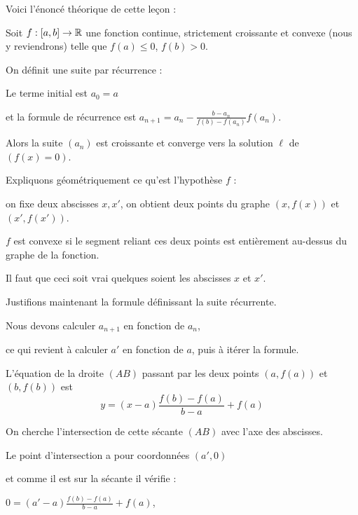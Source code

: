 \diapo


Voici l'énoncé théorique de cette leçon :


 Soit $f : [a,b] \to \mathbb{R}$ une fonction continue, strictement croissante et convexe (nous y reviendrons) telle
 que $f(a) \le 0$, $f(b) > 0$.
 
 On définit une suite par récurrence :
 
 Le terme initial est $a_0=a$
 
 et la formule de récurrence est $a_{n+1} = a_n - \frac{b-a_n}{f(b)-f(a_n)}f(a_n)$.
 
 Alors la suite $(a_n)$  est croissante et converge vers la solution $\ell$ de $(f(x)=0)$.
 
 

\diapo


Expliquons géométriquement ce qu'est l'hypothèse $f$  :

on fixe deux abscisses $x,x'$, on obtient
deux points du graphe $(x,f(x))$ et $(x',f(x'))$.


$f$ est convexe si le segment reliant ces deux points est entièrement au-dessus
du graphe de la fonction.

Il faut que ceci soit vrai quelques soient les abscisses $x$ et $x'$.


\diapo


Justifions maintenant la formule définissant la suite récurrente. 

\change

Nous devons calculer $a_{n+1}$ en fonction de $a_n$,

ce qui revient à calculer $a'$ en fonction de $a$, puis à itérer la formule.


\change

\change

      L'équation de la droite $(AB)$ passant par les deux points $(a,f(a))$ et $(b,f(b))$ 
est 
$$y=(x-a) \frac{f(b)-f(a)}{b-a} + f(a)$$


On cherche l'intersection de cette sécante $(AB)$ avec l'axe des abscisses.

\change

Le point d'intersection a pour coordonnées $(a',0)$ 

et comme il est sur la sécante il vérifie :

$0=(a'-a) \frac{f(b)-f(a)}{b-a} + f(a)$, 

